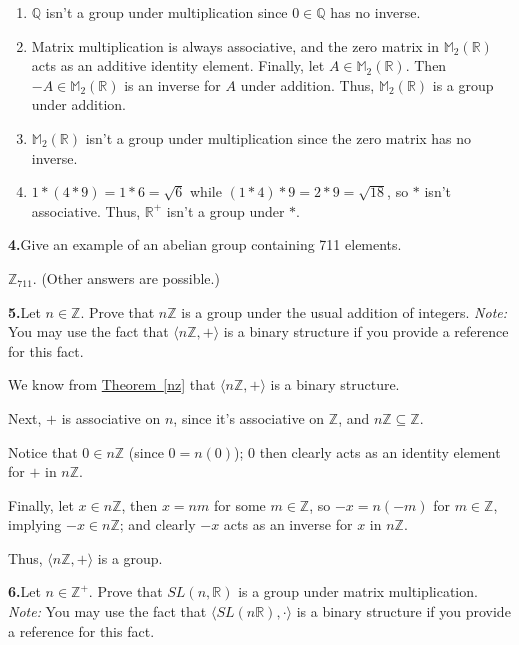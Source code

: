 \documentclass[10pt,]{book}
\theoremstyle{plain}
\theoremstyle{definition}
\theoremstyle{definition}
\theoremstyle{definition}
\theoremstyle{definition}
\numberwithin{equation}{section}
\def\Z{\mathbb{Z}}
\def\R{\mathbb{R}}
\def\Q{\mathbb{Q}}
\def\M{\mathbb{M}}
\begin{document}
%
\par\smallskip
\leavevmode%
\begin{enumerate}[label=(\alph*)]
\item\hypertarget{li-118}{}\(\Q\) isn't a group under multiplication since \(0\in \Q\) has no inverse.%
\item\hypertarget{li-119}{}Matrix multiplication is always associative, and the zero matrix in \(\M_2(\R)\) acts as an additive identity element.            Finally, let \(A\in \M_2(\R)\).  Then \(-A\in \M_2(\R)\) is an inverse for \(A\) under addition. Thus, \(\M_2(\R)\) is a group under addition.%
\item\hypertarget{li-120}{}\(\M_2(\R)\) isn't a group under multiplication since the zero matrix has no inverse.%
\item\hypertarget{li-121}{}\(1*(4*9)=1*6=\sqrt{6}\) while \((1*4)*9=2*9=\sqrt{18}\), so \(*\) isn't associative.  Thus, \(\R^+\) isn't a group under \(*\).%
\end{enumerate}
\par\smallskip
\noindent\textbf{4.}\quad{}Give an example of an abelian group containing 711 elements.%
\par\smallskip
\(\Z_{711}\). (Other answers are possible.)%
\par\smallskip
\noindent\textbf{5.}\quad{}Let \(n\in \Z\). Prove that \(n\Z\) is a group under the usual addition of integers. \emph{Note:} You may use the fact that \(\langle n\Z,+\rangle\) is a binary structure if you provide a reference for this fact.%
\par\smallskip
We know from \hyperref[nz]{Theorem~\ref{nz}} that \(\langle n\Z,+\rangle\) is a binary structure.%
\par
Next, \(+\) is associative on \(n\), since it's associative on \(\Z\), and \(n\Z \subseteq \Z\).%
\par
Notice that \(0\in n\Z\) (since \(0=n(0)\)); 0 then clearly acts as an identity element for \(+\) in \(n\Z\).%
\par
Finally, let \(x\in n\Z\), then \(x=nm\) for some \(m\in \Z\), so \(-x=n(-m)\) for \(m\in \Z\), implying \(-x\in n\Z\); and clearly \(-x\) acts as an inverse for \(x\) in \(n\Z\).%
\par
Thus, \(\langle n\Z, +\rangle\) is a group.%
\par\smallskip
\noindent\textbf{6.}\quad{}Let \(n\in \Z^+\). Prove that \(SL(n,\R)\) is a group under matrix multiplication. \emph{Note:} You may use the fact that \(\langle SL(n\R),\cdot\rangle\) is a binary structure if you provide a reference for this fact.%
\end{document}
